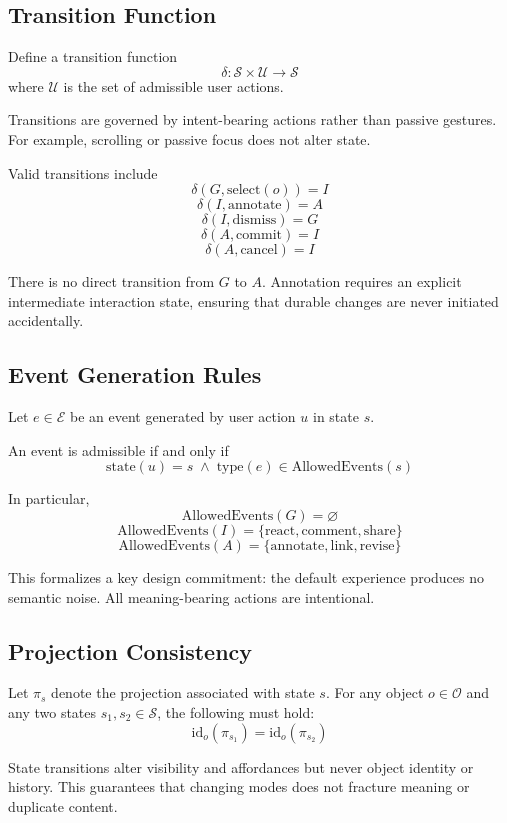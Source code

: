 \documentclass[11pt,oneside]{article}
\begin{document}
\subsection{Transition Function}

Define a transition function
\[
\delta : \mathcal{S} \times \mathcal{U} \rightarrow \mathcal{S}
\]
where $\mathcal{U}$ is the set of admissible user actions.

Transitions are governed by intent-bearing actions rather than passive gestures. For example, scrolling or passive focus does not alter state.

Valid transitions include
\[
\delta(G, \text{select}(o)) = I
\]
\[
\delta(I, \text{annotate}) = A
\]
\[
\delta(I, \text{dismiss}) = G
\]
\[
\delta(A, \text{commit}) = I
\]
\[
\delta(A, \text{cancel}) = I
\]

There is no direct transition from $G$ to $A$. Annotation requires an explicit intermediate interaction state, ensuring that durable changes are never initiated accidentally.

\subsection{Event Generation Rules}

Let $e \in \mathcal{E}$ be an event generated by user action $u$ in state $s$.

An event is admissible if and only if
\[
\mathrm{state}(u) = s \;\wedge\; \mathrm{type}(e) \in \mathrm{AllowedEvents}(s)
\]

In particular,
\[
\mathrm{AllowedEvents}(G) = \varnothing
\]
\[
\mathrm{AllowedEvents}(I) = \{\text{react}, \text{comment}, \text{share}\}
\]
\[
\mathrm{AllowedEvents}(A) = \{\text{annotate}, \text{link}, \text{revise}\}
\]

This formalizes a key design commitment: the default experience produces no semantic noise. All meaning-bearing actions are intentional.

\subsection{Projection Consistency}

Let $\pi_s$ denote the projection associated with state $s$. For any object $o \in \mathcal{O}$ and any two states $s_1, s_2 \in \mathcal{S}$, the following must hold:
\[
\mathrm{id}_o(\pi_{s_1}) = \mathrm{id}_o(\pi_{s_2})
\]

State transitions alter visibility and affordances but never object identity or history. This guarantees that changing modes does not fracture meaning or duplicate content.
\end{document}
